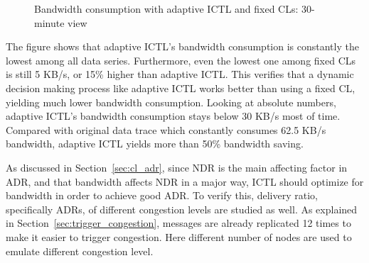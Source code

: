 \documentclass[12pt]{report}
\begin{document}
\begin{figure}[h]
  \caption{\label{fig:adaptive_bandwidth}Bandwidth consumption with adaptive ICTL and fixed CLs: 30-minute view}
\end{figure}

The figure shows that adaptive ICTL's bandwidth consumption is constantly the lowest among all data series. Furthermore, even the lowest one among fixed CLs is still 5 KB/s, or 15\% higher than adaptive ICTL. This verifies that a dynamic decision making process like adaptive ICTL works better than using a fixed CL, yielding much lower bandwidth consumption. Looking at absolute numbers, adaptive ICTL's bandwidth consumption stays below 30 KB/s most of time. Compared with original data trace which constantly consumes 62.5 KB/s bandwidth, adaptive ICTL yields more than 50\% bandwidth saving.

As discussed in Section~\ref{sec:cl_adr}, since NDR is the main affecting factor in ADR, and that bandwidth affects NDR in a major way, ICTL should optimize for bandwidth in order to achieve good ADR. To verify this, delivery ratio, specifically ADRs, of different congestion levels are studied as well. As explained in Section~\ref{sec:trigger_congestion}, messages are already replicated 12 times to make it easier to trigger congestion. Here different number of nodes are used to emulate different congestion level.
\end{document}
